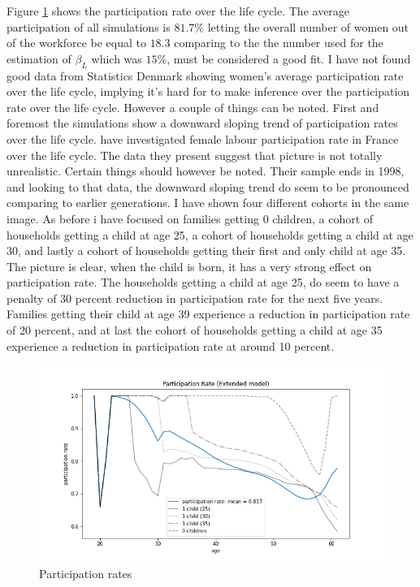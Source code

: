 Figure \ref{fig:ext_model_particpation_rates} shows the participation rate over the life cycle. The average participation of all simulations is $81.7 \%$ letting the overall number of women out of the workforce be equal to $18.3$ comparing to the the number used for the estimation of $\beta_L$ which was $15 \%$, must be considered a good fit. I have not found good data from Statistics Denmark showing women's average participation rate over the life cycle, implying it's hard for to make inference over the participation rate over the life cycle. However a couple of things can be noted. First and foremost the simulations show a downward sloping trend of participation rates over the life cycle. \textcite{grimm_labour_2001} have investigated female labour participation rate in France over the life cycle. The data  they present suggest that picture is not totally unrealistic. Certain things should however be noted. Their sample ends in 1998, and looking to that data, the downward sloping trend do seem to be pronounced comparing to earlier generations. I have shown four different cohorts in the same image. As before i have focused on families getting 0 children, a cohort of households getting a child at age 25, a cohort of households getting a child at age 30, and lastly a cohort of households getting their first and only child at age 35. The picture is clear, when the child is born, it has a very strong effect on participation rate. The households getting a child at age 25, do seem to have a penalty of 30 percent reduction in participation rate for the next five years.
Families getting their child at age 39 experience a reduction in participation rate of 20 percent, and at last the cohort of households getting a child at age 35 experience a reduction in participation rate at around 10 percent.

\begin{figure}
    \centering
    \includegraphics[scale=0.4]{figures/extended_model_participation_rates.png}
    \caption{Participation rates}
    \label{fig:ext_model_particpation_rates}
\end{figure}


